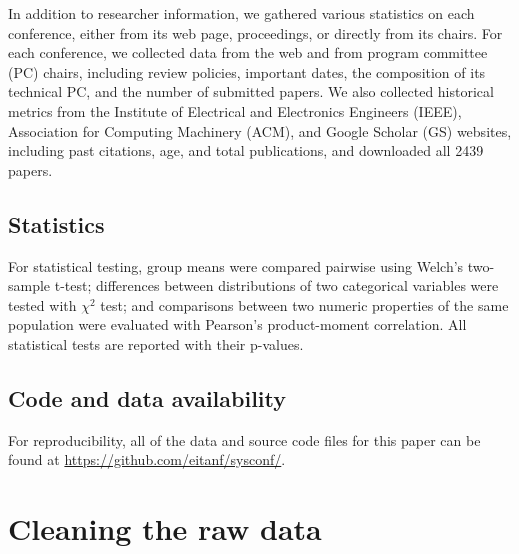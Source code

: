 \documentclass[12pt]{article}
\begin{document}
In addition to researcher information, we gathered various statistics on each conference, either from its web page, proceedings, or directly from its chairs.
For each conference, we collected data from the web and from program committee (PC) chairs, including review policies, important dates, the composition of its technical PC, and the number of submitted papers.
We also collected historical metrics from the Institute of Electrical and Electronics Engineers (IEEE), Association for Computing Machinery (ACM), and Google Scholar (GS) websites, including past citations, age, and total publications, and downloaded all 2439 papers.

\hypertarget{statistics}{%
\subsection{Statistics}\label{statistics}}

For statistical testing, group means were compared pairwise using Welch's two-sample t-test; differences between distributions of two categorical variables were tested with \(\chi^{2}\) test; and comparisons between two numeric properties of the same population were evaluated with Pearson's product-moment correlation. All statistical tests are reported with their p-values.

\hypertarget{code-and-data-availability}{%
\subsection{Code and data availability}\label{code-and-data-availability}}

For reproducibility, all of the data and source code files for this paper can be found at \url{https://github.com/eitanf/sysconf/}.

\hypertarget{sec:cleaning}{%
\section{Cleaning the raw data}\label{sec:cleaning}}
\end{document}
